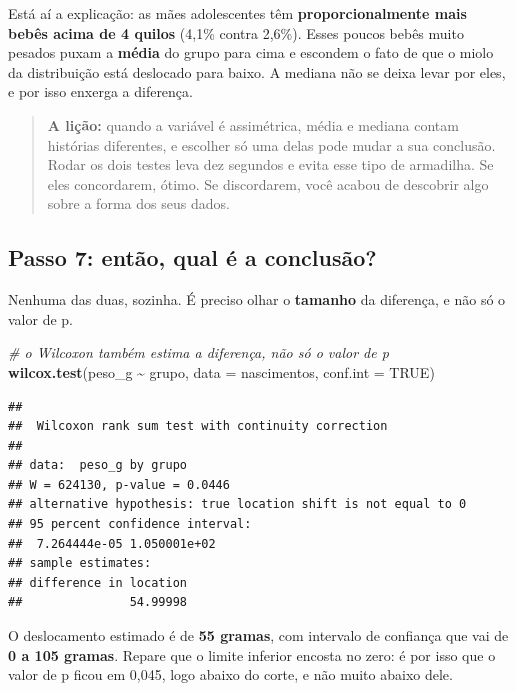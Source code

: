 \documentclass[
]{book}
\newenvironment{Shaded}{\begin{snugshade}}{\end{snugshade}}
\newcommand{\AttributeTok}[1]{\textcolor[rgb]{0.13,0.29,0.53}{#1}}
\newcommand{\CommentTok}[1]{\textcolor[rgb]{0.56,0.35,0.01}{\textit{#1}}}
\newcommand{\ConstantTok}[1]{\textcolor[rgb]{0.56,0.35,0.01}{#1}}
\newcommand{\FunctionTok}[1]{\textcolor[rgb]{0.13,0.29,0.53}{\textbf{#1}}}
\newcommand{\NormalTok}[1]{#1}
\newcommand{\SpecialCharTok}[1]{\textcolor[rgb]{0.81,0.36,0.00}{\textbf{#1}}}
\begin{document}
Está aí a explicação: as mães adolescentes têm \textbf{proporcionalmente mais bebês acima de 4 quilos} (4,1\% contra 2,6\%). Esses poucos bebês muito pesados puxam a \textbf{média} do grupo para cima e escondem o fato de que o miolo da distribuição está deslocado para baixo. A mediana não se deixa levar por eles, e por isso enxerga a diferença.

\begin{quote}
\textbf{A lição:} quando a variável é assimétrica, média e mediana contam histórias diferentes, e escolher só uma delas pode mudar a sua conclusão. Rodar os dois testes leva dez segundos e evita esse tipo de armadilha. Se eles concordarem, ótimo. Se discordarem, você acabou de descobrir algo sobre a forma dos seus dados.
\end{quote}

\subsection{Passo 7: então, qual é a conclusão?}\label{passo-7-entuxe3o-qual-uxe9-a-conclusuxe3o}

Nenhuma das duas, sozinha. É preciso olhar o \textbf{tamanho} da diferença, e não só o valor de p.

\begin{Shaded}
\begin{Highlighting}[]
\CommentTok{\# o Wilcoxon também estima a diferença, não só o valor de p}
\FunctionTok{wilcox.test}\NormalTok{(peso\_g }\SpecialCharTok{\textasciitilde{}}\NormalTok{ grupo, }\AttributeTok{data =}\NormalTok{ nascimentos, }\AttributeTok{conf.int =} \ConstantTok{TRUE}\NormalTok{)}
\end{Highlighting}
\end{Shaded}

\begin{verbatim}
## 
##  Wilcoxon rank sum test with continuity correction
## 
## data:  peso_g by grupo
## W = 624130, p-value = 0.0446
## alternative hypothesis: true location shift is not equal to 0
## 95 percent confidence interval:
##  7.264444e-05 1.050001e+02
## sample estimates:
## difference in location 
##               54.99998
\end{verbatim}

O deslocamento estimado é de \textbf{55 gramas}, com intervalo de confiança que vai de \textbf{0 a 105 gramas}. Repare que o limite inferior encosta no zero: é por isso que o valor de p ficou em 0,045, logo abaixo do corte, e não muito abaixo dele.
\end{document}
